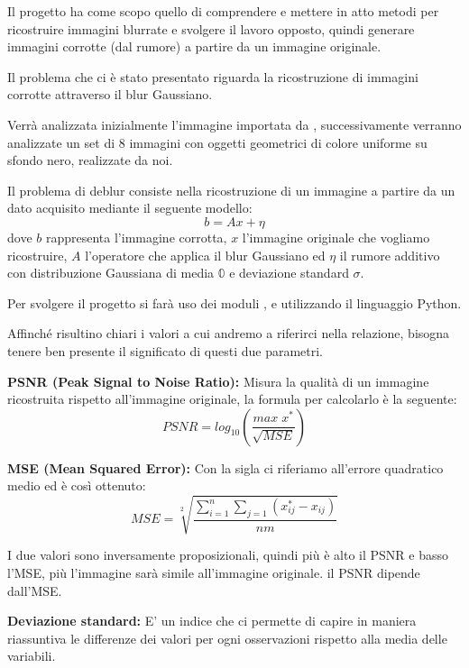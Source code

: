 Il progetto ha come scopo quello di comprendere e mettere in atto metodi per ricostruire 
immagini blurrate e svolgere il lavoro opposto, quindi generare immagini corrotte (dal rumore) a partire da un immagine 
originale. 

Il problema che ci è stato presentato riguarda la ricostruzione di 
immagini corrotte attraverso il blur Gaussiano.

Verrà analizzata inizialmente l'immagine  importata da
, successivamente verranno analizzate un set di 8 immagini con oggetti geometrici di colore uniforme su sfondo
 nero, realizzate da noi.

Il problema di deblur consiste nella ricostruzione di un immagine a partire da un dato acquisito mediante il seguente modello:
\[b=Ax+\eta\]
dove $b$ rappresenta l'immagine corrotta, $x$ l'immagine originale che vogliamo ricostruire, $A$ l'operatore che applica il 
blur Gaussiano ed $\eta$ il rumore additivo con distribuzione Gaussiana di  media $\mathbb{0}$ e deviazione standard $\sigma$.

Per svolgere il progetto si farà uso dei moduli ,  e 
utilizzando il linguaggio Python.

Affinché risultino chiari i valori a cui andremo a riferirci nella relazione, bisogna tenere ben presente il significato di questi due parametri. 

\textbf{PSNR (Peak Signal to Noise Ratio):} Misura la qualità di un immagine ricostruita rispetto all'immagine originale, la formula per calcolarlo è la seguente: \[PSNR = log_{10}(\frac{max\;x^\ast}{\sqrt{MSE}})\]

\textbf{MSE (Mean Squared Error):}  Con la sigla ci riferiamo all'errore quadratico medio ed è così ottenuto: \[MSE = \sqrt[2]{\frac{\sum_{i=1}^n\sum_{j=1}(x^{\ast}_{ij}-x_{ij})}{nm}}\]

I due valori sono inversamente proposizionali, quindi più è alto il PSNR e basso l'MSE, più l'immagine sarà simile all'immagine originale. il PSNR dipende dall'MSE.

\textbf{Deviazione standard:} E' un indice che ci permette di capire in maniera riassuntiva le differenze dei valori per ogni osservazioni rispetto alla media delle variabili. 
